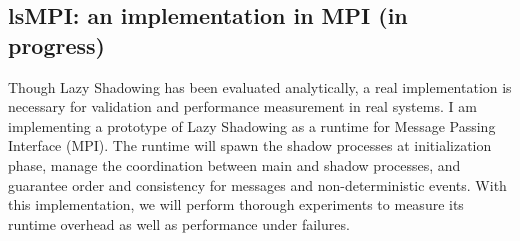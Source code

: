 %

\subsection{lsMPI: an implementation in MPI (in progress)}

Though Lazy Shadowing has been evaluated analytically, a real implementation 
is necessary for validation and performance measurement in real systems. I am implementing a prototype of Lazy 
Shadowing as a runtime for Message Passing Interface (MPI). %
The runtime will spawn 
the shadow processes at initialization phase, manage the coordination between main and shadow processes, 
and guarantee order and consistency for messages and non-deterministic events. With this implementation, we will perform thorough 
experiments to measure its runtime overhead as well as performance under failures.

